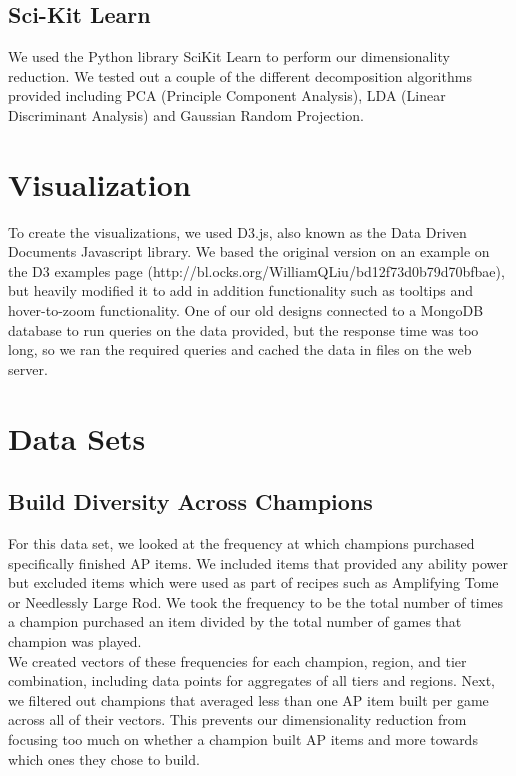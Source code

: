 \documentclass[11pt]{amsart}
\begin{document}
\subsection{Sci-Kit Learn}
We used the Python library SciKit Learn to perform our dimensionality reduction. We tested out a couple of the different decomposition algorithms provided including PCA (Principle Component Analysis), LDA (Linear Discriminant Analysis) and Gaussian Random Projection.\\


\section{Visualization}
To create the visualizations, we used D3.js, also known as the Data Driven Documents Javascript library. We based the original version on an example on the D3 examples page (http://bl.ocks.org/WilliamQLiu/bd12f73d0b79d70bfbae), but heavily modified it to add in addition functionality such as tooltips and hover-to-zoom functionality. One of our old designs connected to a MongoDB database to run queries on the data provided, but the response time was too long, so we ran the required queries and cached the data in files on the web server.\\


\section{Data Sets}
\subsection{Build Diversity Across Champions}

For this data set, we looked at the frequency at which champions purchased specifically finished AP items. We included items that provided any ability power but excluded items which were used as part of recipes such as Amplifying Tome or Needlessly Large Rod. We took the frequency to be the total number of times a champion purchased an item divided by the total number of games that champion was played.\\ 

We created vectors of these frequencies for each champion, region, and tier combination, including data points for aggregates of all tiers and regions. Next, we filtered out champions that averaged less than one AP item built per game across all of their vectors. This prevents our dimensionality reduction from focusing too much on whether a champion built AP items and more towards which ones they chose to build.\\
\end{document}
